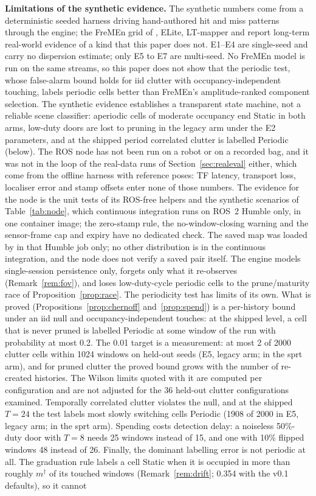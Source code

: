 \noindent\textbf{Limitations of the synthetic evidence.} The synthetic numbers come from a deterministic seeded harness driving hand-authored hit and miss patterns through the engine; the FreMEn grid of \citet{krajnik2016persistent}, ELite, LT-mapper and \citet{berrio2021longterm} report long-term real-world evidence of a kind that this paper does not. E1--E4 are single-seed and carry no dispersion estimate; only E5 to E7 are multi-seed. No FreMEn model is run on the same streams, so this paper does not show that the periodic test, whose false-alarm bound holds for iid clutter with occupancy-independent touching, labels periodic cells better than FreMEn's amplitude-ranked component selection. The synthetic evidence establishes a transparent state machine, not a reliable scene classifier: aperiodic cells of moderate occupancy end Static in both arms, low-duty doors are lost to pruning in the legacy arm under the E2 parameters, and at the shipped period correlated clutter is labelled Periodic (below). \EfourLimit{} The ROS node has not been run on a robot or on a recorded bag, and it was not in the loop of the real-data runs of Section~\ref{sec:realeval} either, which come from the offline harness with reference poses: TF latency, transport loss, localiser error and stamp offsets enter none of those numbers. The evidence for the node is the unit tests of its ROS-free helpers and the synthetic scenarios of Table~\ref{tab:node}, which continuous integration runs on ROS~2 Humble only, in one container image; the zero-stamp rule, the no-window-closing warning and the sensor-frame cap and expiry have no dedicated check. The saved map was loaded by  in that Humble job only; no other distribution is in the continuous integration, and the node does not verify a saved pair itself. The engine models single-session persistence only, forgets only what it re-observes (Remark~\ref{rem:fov}), and loses low-duty-cycle periodic cells to the prune/maturity race of Proposition~\ref{prop:race}. The periodicity test has limits of its own. What is proved (Propositions~\ref{prop:chernoff} and~\ref{prop:spend}) is a per-history bound under an iid null and occupancy-independent touches: at the shipped level, a cell that is never pruned is labelled Periodic at some window of the run with probability at most 0.2. The 0.01 target is a measurement: at most 2 of 2000 clutter cells within 1024 windows on held-out seeds (E5, legacy arm; \SqEfiveWorst{} in the sprt arm), and for pruned clutter the proved bound grows with the number of re-created histories. The Wilson limits quoted with it are computed per configuration and are not adjusted for the 36 held-out clutter configurations examined. Temporally correlated clutter violates the null, and at the shipped $T{=}24$ the test labels most slowly switching cells Periodic (1908 of 2000 in E5, legacy arm; \SqEfiveMarkov{} in the sprt arm). Spending costs detection delay: a noiseless 50\%-duty door with $T{=}8$ needs 25 windows instead of 15, and one with 10\% flipped windows 48 instead of 26. Finally, the dominant labelling error is not periodic at all. The graduation rule labels a cell Static when it is occupied in more than roughly $m^\dagger$ of its touched windows (Remark~\ref{rem:drift}; 0.354 with the v0.1 defaults), so it cannot 